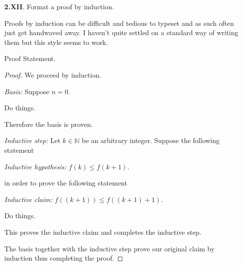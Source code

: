 \begin{enumerate}
\begin{proof}
\begin{addmargin}{1cm}
            Thus $P$ is true.
          \end{addmargin}

          \textbf{Case 3:} ($x>0$)
          \begin{addmargin}{1cm}
            Suppose $x>0$.

            Do things.

            Thus $P$ is true.
          \end{addmargin}

          Since $P$ is true in each case then $P$ must always be true.
        \end{proof}

      \qspace

      \item[\textbf{2.XII}.]
        Format a proof by induction.

        \aspace

        Proofs by induction can be difficult and tedious to typeset and as such often just get handwaved away. I haven't quite settled on a standard way of writing them but this style seems to work.

        \begin{thm}
           Proof Statement.
        \end{thm}
        \begin{proof} We proceed by induction.

        \textit{Basis:} Suppose $n=0$.

        Do things.

        Therefore the basis is proven.

        \textit{Inductive step:} Let $k\in\mathbb{N}$ be an arbitrary integer. Suppose the following statement
        \begin{addmargin}{1cm}
          \textit{Inductive hypothesis:} $f(k)\leq f(k+1)$.
        \end{addmargin}
        in order to prove the following statement
        \begin{addmargin}{1cm}
          \textit{Inductive claim:} $f((k+1))\leq f((k+1)+1)$.
        \end{addmargin}

        Do things.

        This proves the inductive claim and completes the inductive step.

        The basis together with the inductive step prove our original claim by induction thus completing the proof.
        \end{proof}


\end{enumerate}
